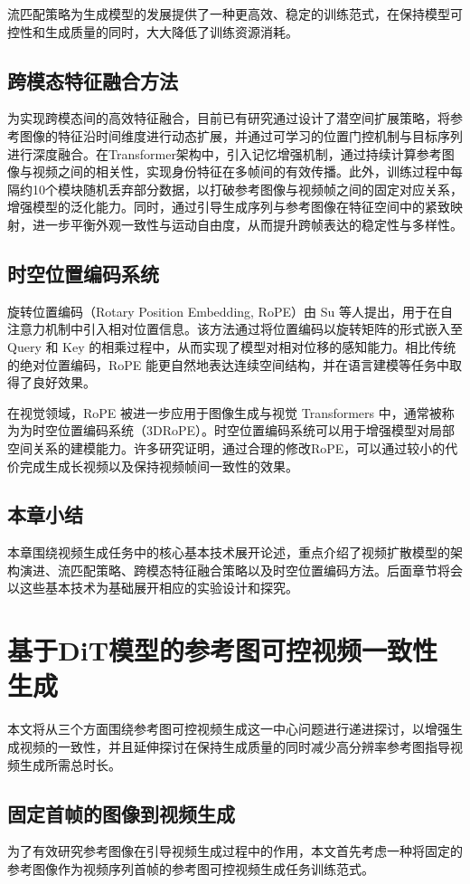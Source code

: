 流匹配策略为生成模型的发展提供了一种更高效、稳定的训练范式，在保持模型可控性和生成质量的同时，大大降低了训练资源消耗。
\subsection{跨模态特征融合方法}
为实现跨模态间的高效特征融合，目前已有研究\cite{huang2025conceptmaster}通过设计了潜空间扩展策略，将参考图像的特征沿时间维度进行动态扩展，并通过可学习的位置门控机制与目标序列进行深度融合。在Transformer架构中，引入记忆增强机制，通过持续计算参考图像与视频之间的相关性，实现身份特征在多帧间的有效传播。此外，训练过程中每隔约10个模块随机丢弃部分数据，以打破参考图像与视频帧之间的固定对应关系，增强模型的泛化能力。同时，通过引导生成序列与参考图像在特征空间中的紧致映射，进一步平衡外观一致性与运动自由度，从而提升跨帧表达的稳定性与多样性。
\subsection{时空位置编码系统}
旋转位置编码（Rotary Position Embedding, RoPE）由 Su\cite{lazos2005rope} 等人提出，用于在自注意力机制中引入相对位置信息。该方法通过将位置编码以旋转矩阵的形式嵌入至 Query 和 Key 的相乘过程中，从而实现了模型对相对位移的感知能力。相比传统的绝对位置编码，RoPE 能更自然地表达连续空间结构，并在语言建模等任务中取得了良好效果。

在视觉领域，RoPE 被进一步应用于图像生成与视觉 Transformers 中，通常被称为为时空位置编码系统（3DRoPE）。时空位置编码系统可以用于增强模型对局部空间关系的建模能力。许多研究证明，通过合理的修改RoPE，可以通过较小的代价完成生成长视频以及保持视频帧间一致性的效果。
\subsection{本章小结}
本章围绕视频生成任务中的核心基本技术展开论述，重点介绍了视频扩散模型的架构演进、流匹配策略、跨模态特征融合策略以及时空位置编码方法。后面章节将会以这些基本技术为基础展开相应的实验设计和探究。
\cleardoublepage
\section{基于DiT模型的参考图可控视频一致性生成}
本文将从三个方面围绕参考图可控视频生成这一中心问题进行递进探讨，以增强生成视频的一致性，并且延伸探讨在保持生成质量的同时减少高分辨率参考图指导视频生成所需总时长。
\subsection{固定首帧的图像到视频生成}\label{sec1}
为了有效研究参考图像在引导视频生成过程中的作用，本文首先考虑一种将固定的参考图像作为视频序列首帧的参考图可控视频生成任务训练范式。

